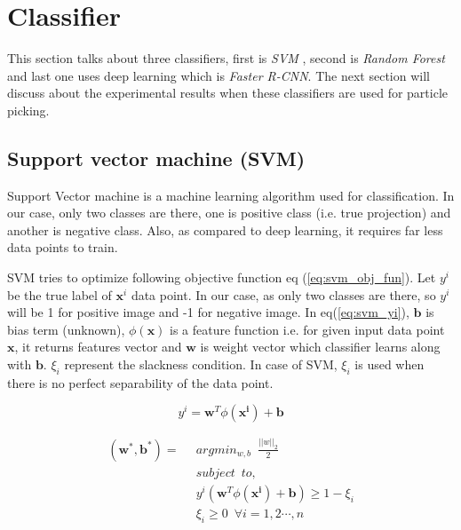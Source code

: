 \documentclass[twoside]{iitbreport}
\begin{document}
\section{Classifier}
This section talks about three classifiers, first is \textit{SVM} , second is \textit{Random Forest} and last one uses deep learning which is \textit{Faster R-CNN}. The next section will discuss about the experimental results when these classifiers are used for particle picking.

\subsection{Support vector machine (SVM) }
Support Vector machine is a machine learning algorithm used for classification. In our case, only two classes are there, one is positive class (i.e. true projection) and  another is negative class. Also, as compared to deep learning, it requires far less data points to train. 

SVM tries to optimize following objective function eq (\ref{eq:svm_obj_fun}).
Let $y^i$ be the true label of $\boldsymbol{x}^i$ data point. In our case, as only two classes are there, so $y^i$ will be 1 for positive image and -1 for negative image. In eq(\ref{eq:svm_yi}), $\boldsymbol{b}$ is bias term (unknown), $\phi(\boldsymbol{x})$ is a feature function i.e. for given input data point $\boldsymbol{x}$, it returns features vector and  $\boldsymbol{w}$ is weight vector which classifier learns along with $\boldsymbol{b}$. $\xi_i$ represent the slackness condition. In case of SVM, $\xi_i$ is used when there is no perfect separability of the data point. 

\begin{equation}\label{eq:svm_yi}
    y^i= \boldsymbol{w}^T \phi(\boldsymbol{x^i}) + \boldsymbol{b}
\end{equation}


\begin{equation}\label{eq:svm_obj_fun}
  \begin{aligned}
    \boldsymbol{(w^*,b^*)} = & \enspace argmin_{w,b} \enspace \frac{||w||_2}{2}\\  
     &\enspace  subject \enspace to,\\
     &\enspace y^i(\boldsymbol{w}^T \phi(\boldsymbol{x^i}) + \boldsymbol{b}) \geq 1-\xi_i\\
      &\enspace \xi_i \geq 0 \enspace  \forall i = 1,2 \cdots , n 
  \end{aligned}
\end{equation}
\end{document}
